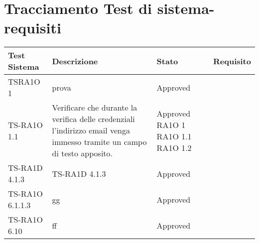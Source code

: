 
\section{Tracciamento Test di sistema-requisiti}

  \begin{center}
  \def\arraystretch{1.5}
  \bgroup
    \begin{longtable}{| p{3cm} | p{6cm} | p{1.5cm} | p{2cm} | }
    \hline 
     \textbf{Test Sistema} & \textbf{Descrizione} & \textbf{Stato} & \textbf{Requisito} \\ \hline
        TSRA1O 1 & 
        prova & Approved \\ \hline 
        TS-RA1O 1.1 & 
        Verificare che durante la verifica delle credenziali l'indirizzo email venga immesso tramite un campo di testo apposito. & Approved       
            RA1O 1 \newline        
            RA1O 1.1 \newline        
            RA1O 1.2 \newline  \\ \hline 
        TS-RA1D 4.1.3 & 
        TS-RA1D 4.1.3 & Approved \\ \hline 
        TS-RA1O 6.1.1.3 & 
        gg & Approved \\ \hline 
        TS-RA1O 6.10 & 
        ff & Approved \\ \hline 
    \end{longtable}
   \egroup
\end{center}